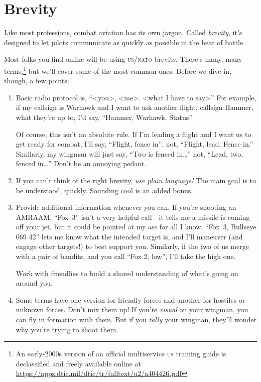 \chapter{Brevity}
\label{brevity}

Like most professions, combat aviation has its own jargon.
Called \emph{brevity}, it's designed to let pilots communicate
as quickly as possible in the heat of battle.

Most folks you find online will be using \textsc{us/nato} brevity.
There's many,
many terms,\punckern\footnote{An early-2000s version of an official
multiservice \textsc{us} training guide is declassified and freely available
online at \url{https://apps.dtic.mil/dtic/tr/fulltext/u2/a404426.pdf}}
but we'll cover some of the most common ones.
Before we dive in, though, a few points:
\begin{enumerate}
\item Basic radio protocol is, ``<you>, <me>. <what I have to say>''
    For example, if my callsign is Warhawk and I want to ask another flight,
    callsign Hammer, what they're up to, I'd say,
    ``Hammer, Warhawk. Status''

    Of course, this isn't an absolute rule.
    If I'm leading a flight and I want us to get ready for combat, I'll say,
    ``Flight, fence in''\quotekern, not, ``Flight, lead. Fence in.''
    Similarly, my wingman will just say, ``Two is fenced in\dots''
    not, ``Lead, two, fenced in\dots''
    Don't be an annoying pedant.

\item If you can't think of the right brevity,
    \emph{use plain language!}
    The main goal is to be understood, quickly.
    Sounding cool is an added bonus.

\item Provide additional information whenever you can.
    If you're shooting an AMRAAM, ``Fox~3'' isn't a very helpful call---it tells
    me a missile is coming off your jet, but it could be pointed at my ass
    for all I know.
    ``Fox~3, Bullseye 069 42'' lets me know what the intended target is,
    and I'll maneuver (and engage other targets!) to best support you.
    Similarly, if the two of us merge with a pair of bandits,
    and you call ``Fox 2,  low''\quotekern,
    I'll take the high one.

    Work with friendlies to build a shared understanding of what's going on
    around you.

\item Some terms have one version for friendly forces
    and another for hostiles or unknown forces.
    Don't mix them up!
    If you're \emph{visual} on your wingman,
    you can fly in formation with them.
    But if you \emph{tally} your wingman,
    they'll wonder why you're trying to shoot them.
\end{enumerate}

